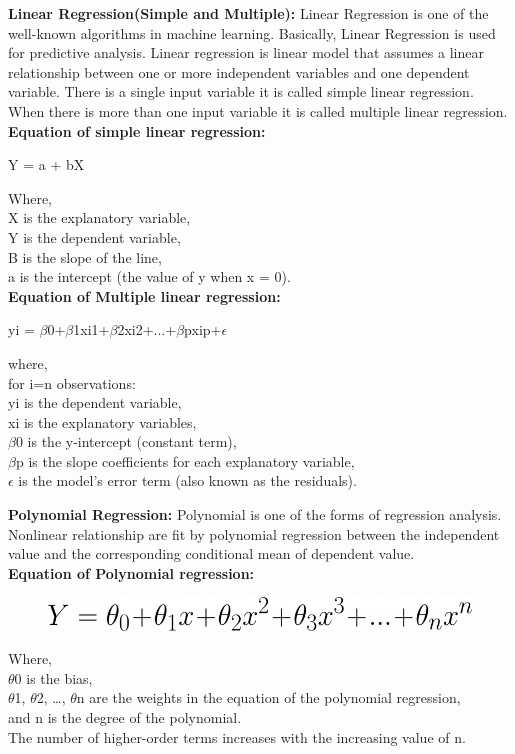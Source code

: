 \documentclass[conference]{IEEEtran}[10]
\begin{document}
\textbf{Linear Regression(Simple and Multiple):}
Linear Regression is one of the well-known algorithms in machine learning. Basically, Linear Regression is used for predictive analysis. Linear regression is linear model that assumes a linear relationship between one or more independent variables and one dependent variable. There is a single input variable it is called simple linear regression. When there is more than one input variable it is called multiple linear regression.
\\\textbf{Equation of simple linear regression:}
\begin{center}
{\large Y = a + bX}
\end{center}
Where,
\\X is the explanatory variable,
\\Y is the dependent variable, 
\\B is the slope of the line,
\\a is the intercept (the value of y when x = 0).
\\\textbf{Equation of Multiple linear regression:}
\begin{center}
{\large yi = $\beta$0+$\beta$1xi1+$\beta$2xi2+...+$\beta$pxip+$\epsilon$}
\end{center}
where,
\\for i=n observations:
\\yi is the dependent variable,
\\xi is the explanatory variables,
\\$\beta$0 is the y-intercept (constant term),
\\$\beta$p  is the slope coefficients for each explanatory variable,
\\$\epsilon$ is the model’s error term (also known as the residuals).



\textbf{Polynomial Regression:}
Polynomial is one of the forms of regression analysis. Nonlinear relationship are fit by polynomial regression between the independent value and the corresponding conditional mean of dependent value. 
\\\textbf{Equation of Polynomial regression:}
\begin{figure}[H]
\centering
\includegraphics[scale=0.35]{pe}
\end{figure}
Where,
\\$\theta$0 is the bias,
\\$\theta$1, $\theta$2, …, $\theta$n are the weights in the equation of the polynomial regression,
\\and n is the degree of the polynomial.
\\The number of higher-order terms increases with the increasing value of n.
\end{document}
